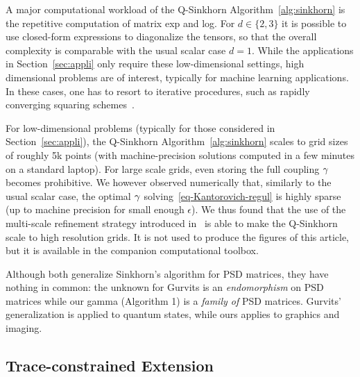 

\begin{rem}
A major computational workload of the Q-Sinkhorn Algorithm~\ref{alg:sinkhorn} is the repetitive computation of matrix exp and log. 
%
For $d \in \{2,3\}$ it is possible to use closed-form expressions to diagonalize the tensors, so that the overall complexity is comparable with the usual scalar case $d=1$.
%
While the applications in Section~\ref{sec:appli} only require these low-dimensional settings, high dimensional problems are of interest, typically for machine learning applications.  In these cases, one has to resort to iterative procedures, such as rapidly converging squaring schemes~\cite{HighamExp,HighamLog}.
\end{rem}

\begin{rem}
For low-dimensional problems (typically for those considered in Section~\ref{sec:appli}), the Q-Sinkhorn Algorithm~\ref{alg:sinkhorn} scales to grid sizes of roughly 5k points (with machine-precision solutions computed in a few minutes on a standard laptop).
%
For large scale grids, even storing the full coupling $\gamma$ becomes prohibitive. We however observed numerically that, similarly  to the usual scalar case, the optimal $\gamma$ solving~\eqref{eq-Kantorovich-regul} is highly sparse (up to machine precision for small enough $\epsilon$).
% 
We thus found that the use of the multi-scale refinement strategy introduced in~\cite{Schmitzer2016} is able to make the Q-Sinkhorn scale to high resolution grids.  It is not used to produce the figures of this article, but it is available in the companion computational toolbox.
\end{rem}

\begin{rem}
 Although both generalize Sinkhorn's algorithm for PSD matrices, they have nothing in common: the unknown for Gurvits is an \emph{endomorphism} on PSD matrices while our gamma (Algorithm 1) is a \emph{family of} PSD matrices. Gurvits' generalization is applied to quantum states, while ours applies to graphics and imaging. 
\end{rem}


\subsection{Trace-constrained Extension}

